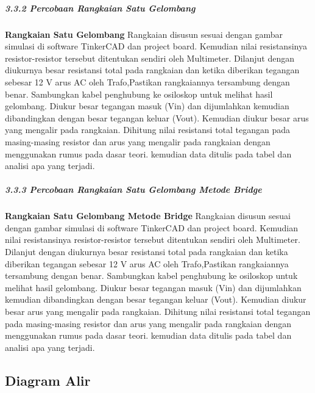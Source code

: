 \documentclass[12pt,a4paper]{article}
\begin{document}
	\subparagraph{3.3.2 Percobaan Rangkaian Satu Gelombang}
	\subparagraph{ }
\textbf{Rangkaian Satu Gelombang} Rangkaian disusun sesuai dengan gambar simulasi di software TinkerCAD dan project board. Kemudian nilai resistansinya resistor-resistor tersebut ditentukan sendiri oleh Multimeter. Dilanjut dengan diukurnya besar resistansi total pada rangkaian dan ketika diberikan tegangan sebesar 12 V arus AC oleh Trafo,Pastikan rangkaiannya tersambung dengan benar. Sambungkan kabel penghubung ke osiloskop untuk melihat hasil gelombang. Diukur besar tegangan masuk (Vin) dan dijumlahkan kemudian dibandingkan dengan besar tegangan keluar (Vout). Kemudian diukur besar arus yang mengalir pada rangkaian. Dihitung nilai resistansi total tegangan pada masing-masing resistor dan arus yang mengalir pada rangkaian dengan menggunakan rumus pada dasar teori. kemudian data ditulis pada tabel dan analisi apa yang terjadi.

	\subparagraph{3.3.3 Percobaan Rangkaian Satu Gelombang Metode Bridge}
	\subparagraph{ }
\textbf{Rangkaian Satu Gelombang Metode Bridge} Rangkaian disusun sesuai dengan gambar simulasi di software TinkerCAD dan project board. Kemudian nilai resistansinya resistor-resistor tersebut ditentukan sendiri oleh Multimeter. Dilanjut dengan diukurnya besar resistansi total pada rangkaian dan ketika diberikan tegangan sebesar 12 V arus AC oleh Trafo,Pastikan rangkaiannya tersambung dengan benar. Sambungkan kabel penghubung ke osiloskop untuk melihat hasil gelombang. Diukur besar tegangan masuk (Vin) dan dijumlahkan kemudian dibandingkan dengan besar tegangan keluar (Vout). Kemudian diukur besar arus yang mengalir pada rangkaian. Dihitung nilai resistansi total tegangan pada masing-masing resistor dan arus yang mengalir pada rangkaian dengan menggunakan rumus pada dasar teori. kemudian data ditulis pada tabel dan analisi apa yang terjadi.

\subsection{Diagram Alir}
\end{document}
